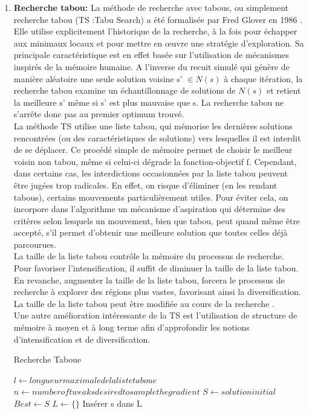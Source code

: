 \begin{enumerate}[label=\alph*)]
	\item \textbf{Recherche tabou: } La méthode de recherche avec tabous, ou simplement recherche tabou (TS :Tabu Search) a été formalisée par Fred Glover en 1986 \cite{glover1986future} . Elle utilise explicitement l’historique de la recherche, à la fois pour échapper aux minimaux locaux et pour mettre en œuvre une stratégie d’exploration. Sa principale caractéristique est en effet basée sur  l’utilisation de mécanismes inspirés de la mémoire humaine. A l'inverse du recuit simulé qui génère de manière aléatoire une seule solution voisine s’ \( \in N(s) \) à chaque itération, la recherche tabou examine un échantillonnage de solutions de \( N(s) \) et retient la meilleure s’ même si s’ est plus mauvaise que s. La recherche tabou ne s'arrête donc pas au premier optimum trouvé. \\
	La méthode TS utilise une liste tabou, qui mémorise les dernières solutions rencontrées (ou des caractéristiques de solutions) vers lesquelles il est interdit de se déplacer. Ce procédé simple de mémoire permet de choisir le meilleur voisin non tabou, même si celui-ci dégrade la fonction-objectif f. Cependant, dans certains cas, les interdictions occasionnées par la liste tabou peuvent être jugées trop radicales. En effet, on risque d’éliminer (en les rendant tabous), certains mouvements particulièrement utiles. Pour éviter cela, on incorpore dans l’algorithme un mécanisme d’aspiration
qui détermine des critères selon lesquels un mouvement, bien que tabou, peut quand même être
accepté, s’il permet d’obtenir une meilleure solution que toutes celles déjà parcourues. \\
La taille de la liste tabou contrôle la mémoire du processus de recherche. Pour favoriser l’intensification, il suffit de diminuer la taille de la liste tabou. En revanche, augmenter la taille de la liste tabou, forcera le processus de recherche à explorer des régions plus vastes, favorisant ainsi la diversification. La taille de la liste tabou peut être modifiée au cours de la recherche \cite{battiti1994reactive} .\\
Une autre amélioration intéressante de la TS est l’utilisation de structure de mémoire à moyen et à long terme afin d’approfondir les notions d’intensification et de diversification.\\
\begin{algorithm}[H]
\caption{Recherche Taboue}
\SetAlgoLined
\DontPrintSemicolon
$ l \gets longueur maximale de la liste taboue $  \;
$ n \gets number of tweaks desired to sample the gradient$ \;
$ S \gets solution initial $ \;
$ Best \gets S $ \;
$ L \gets \{\} $ \;
Insérer s dans L \;


\end{algorithm}
\end{enumerate}

